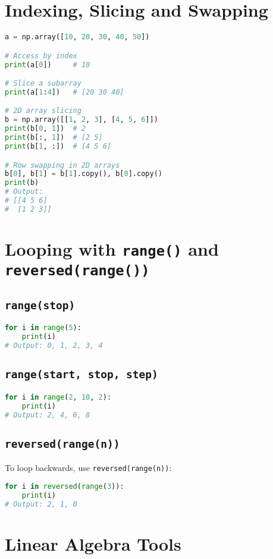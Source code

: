 \documentclass{article}
\begin{document}
\section{Indexing, Slicing and Swapping}
\begin{lstlisting}[language=Python]
a = np.array([10, 20, 30, 40, 50])

# Access by index
print(a[0])     # 10

# Slice a subarray
print(a[1:4])   # [20 30 40]

# 2D array slicing
b = np.array([[1, 2, 3], [4, 5, 6]])
print(b[0, 1])  # 2
print(b[:, 1])  # [2 5]
print(b[1, :])  # [4 5 6]

# Row swapping in 2D arrays
b[0], b[1] = b[1].copy(), b[0].copy()
print(b)
# Output:
# [[4 5 6]
#  [1 2 3]]

\end{lstlisting}

\section{Looping with \texttt{range()} and \texttt{reversed(range())}}

\subsection*{\texttt{range(stop)}}
\begin{lstlisting}[language=Python]
for i in range(5):
    print(i)
# Output: 0, 1, 2, 3, 4
\end{lstlisting}

\subsection*{\texttt{range(start, stop, step)}}
\begin{lstlisting}[language=Python]
for i in range(2, 10, 2):
    print(i)
# Output: 2, 4, 6, 8
\end{lstlisting}

\subsection*{\texttt{reversed(range(n))}}
To loop backwards, use \texttt{reversed(range(n))}:
\begin{lstlisting}[language=Python]
for i in reversed(range(3)):
    print(i)
# Output: 2, 1, 0
\end{lstlisting}

\section{Linear Algebra Tools}
\end{document}
